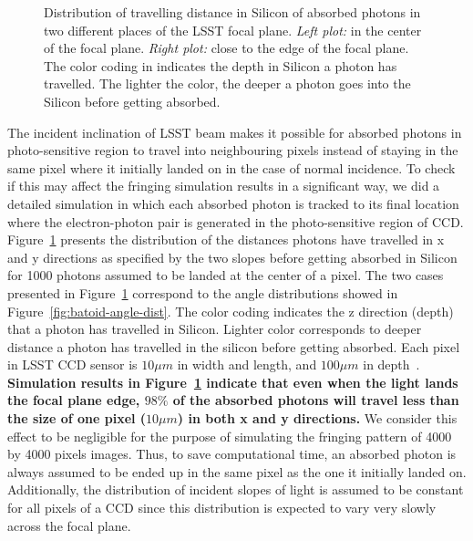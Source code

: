 \documentclass[twocolumn]{aastex63} %
\begin{document}
\begin{CJK*}{UTF8}{gbsn}
\begin{figure}[thb]
\centering
{}
\caption{Distribution of travelling distance in Silicon of absorbed photons in two different places of the LSST focal plane. {\it Left plot:} in the center of the focal plane. {\it Right plot:} close to the edge of the focal plane. The color coding in indicates the depth in Silicon a photon has travelled. The lighter the color, the deeper a photon goes into the Silicon before getting absorbed.}
\label{fig:ab_pho_dist}
\end{figure}


The incident inclination of LSST beam makes it possible for absorbed photons in photo-sensitive region to travel into neighbouring pixels instead of staying in the same pixel where it initially landed on in the case of normal incidence. To check if this may affect the fringing simulation results in a significant way, we did a detailed simulation in which each absorbed photon is tracked to its final location where the electron-photon pair is generated in the photo-sensitive region of CCD. Figure~\ref{fig:ab_pho_dist} presents the distribution of the distances photons have travelled in x and y directions as specified by the two slopes before getting absorbed in Silicon for 1000 photons assumed to be landed at the center of a pixel.  The two cases presented in Figure~\ref{fig:ab_pho_dist} correspond to the angle distributions showed in Figure~\ref{fig:batoid-angle-dist}. The color coding indicates the z direction (depth) that a photon has travelled in Silicon. Lighter color corresponds to deeper distance a photon has travelled in the silicon before getting absorbed. Each pixel in LSST CCD sensor is $10\mu m$ in width and length, and $100\mu m$ in depth~\citep{Ivezi19}. \textbf{Simulation results in Figure~\ref{fig:ab_pho_dist} indicate that even when the light lands the focal plane edge, $98\%$ of the absorbed photons will travel less than the size of one pixel ($10 \mu m$) in both x and y directions.} We consider this effect to be negligible for the purpose of simulating the fringing pattern of 4000 by 4000 pixels images. Thus, to save computational time, an absorbed photon is always assumed to be ended up in the same pixel as the one it initially landed on. Additionally, the distribution of incident slopes of light is assumed to be constant for all pixels of a CCD since this distribution is expected to vary very slowly across the focal plane.




\end{CJK*}
\end{document}
